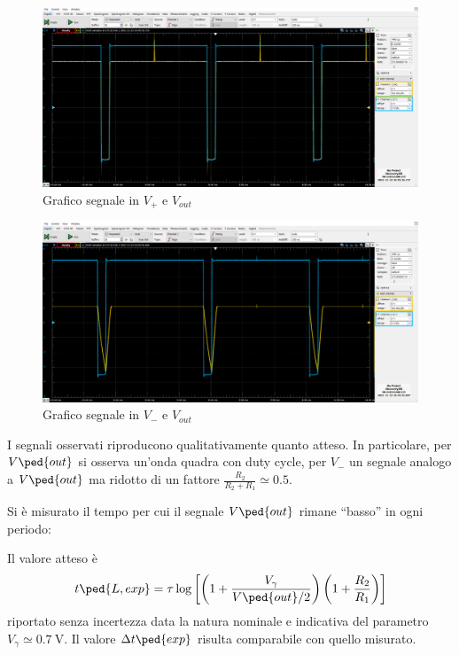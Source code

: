 \documentclass[10pt,a4paper]{article}
\begin{document}
\begin{figure}[htbp]
\centering
\includegraphics[scale=0.42]{monostabileV+}
\caption{Grafico segnale in $V_+$ e $V_{out}$}
\end{figure}

\begin{figure}[htbp]
\centering
\includegraphics[scale=0.42]{monostabileV-}
\caption{Grafico segnale in $V_-$ e $V_{out}$}
\end{figure}

I segnali osservati riproducono qualitativamente quanto atteso.
In particolare, per $ V \ped{out} $ si osserva un'onda quadra con duty cycle,
per $ V_{-} $ un segnale analogo a $ V\ped{out} $ ma ridotto di un fattore
$\frac{R_2}{R_2 + R_1} \simeq 0.5 $.

Si è misurato il tempo per cui il segnale $ V \ped{out} $ rimane ``basso'' in ogni periodo:

Il valore atteso è
\begin{equation} \label{eq: mstable}
t\ped{L, exp} =
\tau \log\left[\left(1 + \frac{V_\gamma}{V \ped{out}/2}\right)
\left(1 + \frac{R_2}{R_1}\right)\right]
\end{equation}
riportato senza incertezza data la natura nominale e indicativa del parametro $ V_{\gamma} \simeq \SI{0.7}{\volt} $. Il valore $ \Delta t \ped{exp} $ risulta comparabile con quello misurato.
\end{document}
